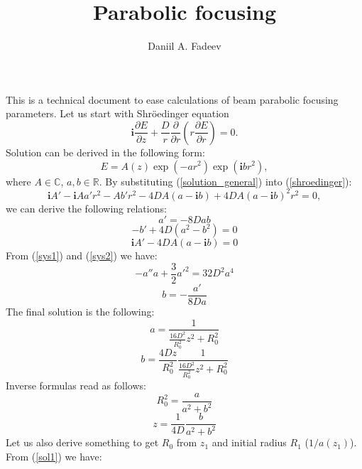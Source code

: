 \documentclass{article}
\title{Parabolic focusing} %
\author{Daniil A. Fadeev}
\newcommand{\dd}{\partial}
\newcommand{\ff}{\frac}
\newcommand{\ci}{\mathbf{i}}
\begin{document}
\maketitle
This is a technical document to ease calculations of beam parabolic focusing parameters.
Let us start with Shr{\"o}edinger equation
\begin{equation}
\label{shroedinger}
\ci\ff{\dd E}{\dd z}+\ff{D}{r}\ff{\dd}{\dd r}\left(r \ff{\dd E}{\dd r}\right) = 0.
\end{equation}
Solution can be derived in the following form:
\begin{equation}
\label{solution_general}
E = A(z) \exp(-a r^2) \exp(\ci b r^2),
\end{equation}
where $A \in \mathbb{C}$, $a,b \in \mathbb{R}$. By substituting (\ref{solution_general}) into (\ref{shroedinger}):
\begin{equation}
\label{subst}
\ci A' - \ci A a' r^2 - A b' r^2 - 4 D A (a-\ci b) + 4DA(a-\ci b)^2 r^2=0,
\end{equation}
we can derive the following relations:
\begin{equation}
\label{sys1}
a' = -8Dab
\end{equation}
\begin{equation}
\label{sys2}
-b'+4D(a^2-b^2)=0
\end{equation}
\begin{equation}
\label{sys3}
\ci A'-4DA(a-\ci b)=0
\end{equation}
From (\ref{sys1}) and (\ref{sys2}) we have:
\begin{equation}
\label{sys2_1}
-a''a+\ff{3}{2}a'^2=32D^2a^4
\end{equation}
\begin{equation}
\label{sys2_2}
b=-\ff{a'}{8Da}
\end{equation}
The final solution is the following:
\begin{equation}
\label{sol1}
a=\ff{1}{\ff{16D^2}{R_0^2}z^2+R_0^2}
\end{equation}
\begin{equation}
\label{sol2}
b=\ff{4Dz}{R_0^2}\ff{1}{\ff{16D^2}{R_0^2}z^2+R_0^2}
\end{equation}
Inverse formulas read as follows:
\begin{equation}
\label{invsol1}
R_0^2=\ff{a}{a^2+b^2}
\end{equation}
\begin{equation}
\label{invsol2}
z=\ff{1}{4D}\ff{b}{a^2+b^2}
\end{equation}
Let us also derive something to get $R_0$ from $z_1$ and initial radius $R_1$ ($1/a(z_1)$). From (\ref{sol1}) we have:
\end{document}
